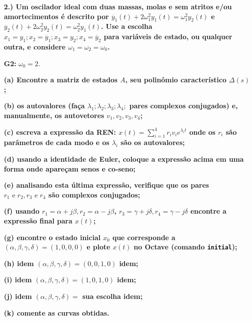 \documentclass[11pt]{article}
\begin{document}
\textbf{2.) Um oscilador ideal com duas massas, molas e sem atritos e/ou amortecimentos é descrito por $\ddot{y_1}(t) + 2\omega_1^2 y_1(t) = \omega_1^2 y_2(t)$ e $\ddot{y_2}(t) + 2\omega_2^2 y_2(t) = \omega_2^2 y_1(t)$. Use a escolha $x_1 = y_1; x_2 = \dot{y_1}; x_3 = y_2; x_4 = \dot{y_2}$ para variáveis de estado, ou qualquer outra, e considere $\omega_1 = \omega_2 = \omega_0$.}

\textbf{G2: } $\omega_0 = 2$.

\textbf{(a) Encontre a matriz de estados $A$, seu polinômio característico $\Delta(s)$;}

\textbf{(b) os autovalores (faça $\lambda_1; \lambda_2; \lambda_3; \lambda_4;$ pares complexos conjugados) e, manualmente, os autovetores $v_1, v_2, v_3, v_4$;}

\textbf{(c) escreva a expressão da REN: $x(t) = \sum_{i=1}^{4} r_i v_i e^{\lambda_i t}$ onde os $r_i$ são parâmetros de cada modo e os $\lambda_i$ são os autovalores;}

\textbf{(d) usando a identidade de Euler, coloque a expressão acima em uma forma onde apareçam senos e co-seno;}

\textbf{(e) analisando esta última expressão, verifique que os pares $r_1 \text{ e } r_2, r_3 \text{ e } r_4$ são complexos conjugados;}

\textbf{(f) usando $r_1 = \alpha + j\beta, r_2 = \alpha - j\beta$, $r_3 = \gamma + j\delta, r_4 = \gamma - j\delta$ encontre a expressão final para $x(t)$;}

\textbf{(g) encontre o estado inicial $x_0$ que corresponde a $(\alpha, \beta, \gamma, \delta) = (1, 0, 0, 0)$ e plote $x(t)$ no Octave (comando \texttt{initial});}

\textbf{(h) idem $(\alpha, \beta, \gamma, \delta) = (0, 0, 1, 0)$ idem;}

\textbf{(i) idem $(\alpha, \beta, \gamma, \delta) = (1, 0, 1, 0)$ idem;}

\textbf{(j) idem $(\alpha, \beta, \gamma, \delta) = $ sua escolha idem;}

\textbf{(k) comente as curvas obtidas.}
\end{document}
